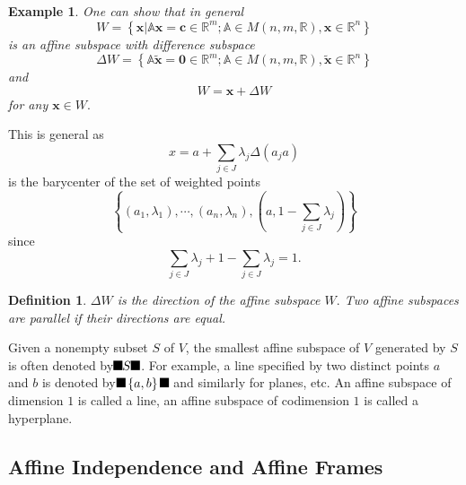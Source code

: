 \documentclass[aps,preprint]{revtex4}%
\providecommand{\U}[1]{\protect\rule{.1in}{.1in}}
\newtheorem{definition}[theorem]{Definition}
\newtheorem{example}[theorem]{Example}
\begin{document}
\begin{example}
One can show that in general
\begin{equation}
W=\left\{  \left.  \mathbf{x}\right\vert \mathbb{A}\mathbf{x}=\mathbf{c}%
\in\mathbb{R}^{m};\mathbb{A\in}M\left(  n,m,\mathbb{R}\right)  \mathbf{,x\in
}\mathbb{R}^{n}\right\}
\end{equation}
is an affine subspace with difference subspace
\begin{equation}
\Delta W=\left\{  \mathbb{A}\widetilde{\mathbf{x}}=\mathbf{0}\in\mathbb{R}%
^{m};\mathbb{A\in}M\left(  n,m,\mathbb{R}\right)  \mathbf{,}%
\widetilde{\mathbf{x}}\mathbf{\in}\mathbb{R}^{n}\right\}
\end{equation}
and
\begin{equation}
W=\mathbf{x}+\Delta W
\end{equation}
for any $\mathbf{x\in}W.$
\end{example}

This is general as
\begin{equation}
x=a+\sum_{j\in J}\lambda_{j}\Delta\left(  a_{j}a\right)
\end{equation}
is the barycenter of the set of weighted points
\begin{equation}
\left\{  \left(  a_{1},\lambda_{1}\right)  ,\cdots,\left(  a_{n},\lambda
_{n}\right)  ,\left(  a,1-\sum_{j\in J}\lambda_{j}\right)  \right\}
\end{equation}
since
\begin{equation}
\sum_{j\in J}\lambda_{j}+1-\sum_{j\in J}\lambda_{j}=1.
\end{equation}


\begin{definition}
$\Delta W$ is the direction of the affine subspace $W.$ Two affine subspaces
are parallel if their directions are equal.
\end{definition}

Given a nonempty subset $S$ of $V$, the smallest affine subspace of $V$
generated by $S$ is often denoted by$\U{3008} S\U{3009} $. For example, a line
specified by two distinct points $a$ and $b$ is denoted by$\U{3008} \left\{
a,b\right\}  \U{3009} $ and similarly for planes, etc. An affine subspace of
dimension $1$ is called a line, an affine subspace of codimension $1$ is
called a hyperplane.

\subsection{Affine Independence and Affine Frames}
\end{document}
